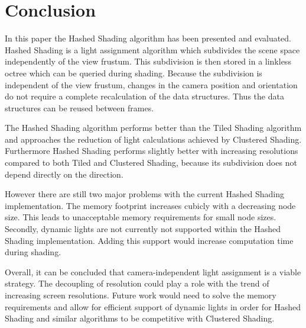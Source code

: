 \section{Conclusion}

In this paper the Hashed Shading algorithm has been presented and evaluated. Hashed Shading is
a light assignment algorithm which subdivides the scene space independently of the
view frustum. This subdivision is then stored in a linkless octree which can be queried during
shading. Because the subdivision is independent of the view frustum, changes in the camera
position and orientation do not require a complete recalculation of the data structures. Thus the
data structures can be reused between frames.

The Hashed Shading algorithm performs better than the Tiled Shading algorithm and
approaches the reduction of light calculations achieved by Clustered Shading.
Furthermore Hashed Shading performs slightly better with increasing resolutions
compared to both Tiled and Clustered Shading, because its subdivision does not
depend directly on the direction.

However there are still two major problems with the current Hashed Shading implementation.
The memory footprint increases cubicly with a decreasing node size. This leads
to unacceptable memory requirements for small node sizes. Secondly, dynamic lights
are not currently not supported within the Hashed Shading implementation. Adding
this support would increase computation time during shading.

Overall, it can be concluded that camera-independent light assignment is a viable strategy.
The decoupling of resolution could play a role with the trend of increasing screen resolutions.
Future work would need to solve the memory requirements and allow for efficient support
of dynamic lights in order for Hashed Shading and similar algorithms to be competitive with
Clustered Shading.


